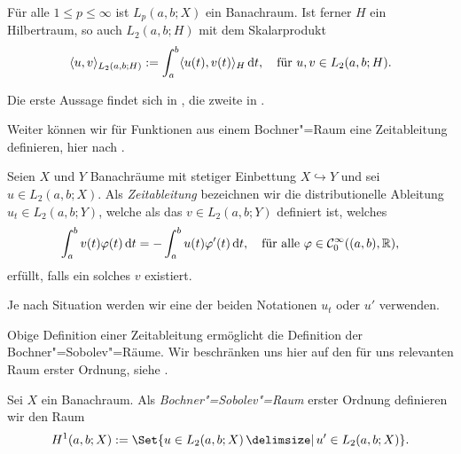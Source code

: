 \documentclass[../main.tex]{subfiles}
\begin{document}
\begin{Lemma}
\label{lemma:bochnerraum_ist_banachraum_bzw_hilbertraum}
    Für alle $1 \leq p \leq \infty$ ist $L_{p}(a, b; X)$ ein Banachraum.
    Ist ferner $H$ ein Hilbertraum, so auch $L_{2}(a, b; H)$ mit dem Skalarprodukt
    \begin{equation}
        \skp{u}{v}{L_{2}(a, b; H)} := \int_{a}^{b} \skp{u(t)}{v(t)}{H} \diff t, \quad \text{für}~u,v \in L_{2}(a, b; H).
    \end{equation}

    \begin{Beweis}
        Die erste Aussage findet sich in \cite[Proposition XVIII.1.1]{Dautray:1992by}, die zweite in \cite[Abschnitt 1.1.3]{Lions:1972tg}.
    \end{Beweis}
\end{Lemma}

Weiter können wir für Funktionen aus einem Bochner"=Raum eine Zeitableitung definieren, hier nach \cites[471]{Dautray:1992by}[Definition 10.6]{Schweizer2013}.

\begin{Definition}%
\label{definition:zeitableitung}
    Seien $X$ und $Y$ Banachräume mit stetiger Einbettung $X \hookrightarrow Y$ und sei $u \in L_{2}(a, b; X)$.
    Als \emph{Zeitableitung} bezeichnen wir die distributionelle Ableitung $u_{t} \in L_{2}(a, b; Y)$, welche als das $v \in L_{2}(a, b; Y)$ definiert ist, welches
    \begin{equation}
        \int_{a}^{b} v(t) \varphi(t) \diff t = - \int_{a}^{b} u(t) \varphi'(t) \diff t, \quad \fa \varphi \in \mathcal C^{\infty}_{0}((a, b), \mathbb{R}),
    \end{equation}
    erfüllt, falls ein solches $v$ existiert.
\end{Definition}

\begin{Bemerkung}
    Je nach Situation werden wir eine der beiden Notationen $u_{t}$ oder $u'$ verwenden.
\end{Bemerkung}

Obige Definition einer Zeitableitung ermöglicht die Definition der Bochner"=Sobolev"=Räume.
Wir beschränken uns hier auf den für uns relevanten Raum erster Ordnung, siehe \cite[Section 5.9.2]{evans2010partial}.

\begin{Definition}
\label{definition:bochner_sobolev_raum}
    Sei $X$ ein Banachraum.
    Als \emph{Bochner"=Sobolev"=Raum} erster Ordnung definieren wir den Raum
    \begin{equation}
        H^{1}(a, b; X) := \Set{u \in L_{2}(a, b; X) \given u' \in L_{2}(a, b; X)}.
    \end{equation}
\end{Definition}
\end{document}
